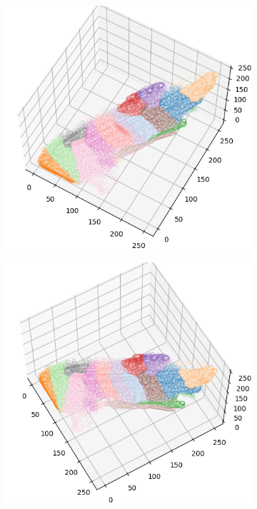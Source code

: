 \begin{figure}[htbp]
\begin{subfigure}[t]{0.32\textwidth}
    \end{subfigure}
    \begin{subfigure}[t]{0.32\textwidth}
        \includegraphics[width=\linewidth]{../../python_code/plots/kmeans/cat-10/clusters_elev60_azim-60.png}
    \end{subfigure}
    \begin{subfigure}[t]{0.32\textwidth}
        \includegraphics[width=\linewidth]{../../python_code/plots/kmeans/cat-10/clusters_elev60_azim-30.png}

\end{subfigure}
\end{figure}
